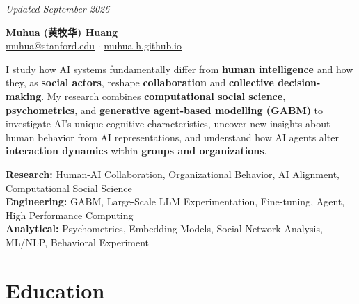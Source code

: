 \documentclass[11pt,letterpaper]{article}
\begin{document}
\begin{flushright}
\vspace{-1em}
\footnotesize\textit{Updated September 2026}
\end{flushright}

\vspace{-1em}

\begin{center}
{\LARGE\bfseries Muhua (黄牧华) Huang}\\[0.4em]
{\small\color{gray}
\href{mailto:muhua@stanford.edu}{muhua@stanford.edu}
\quad$\cdot$\quad
\href{https://muhua-h.github.io/}{muhua-h.github.io}}
\end{center}

\vspace{-0.3em}

\begin{statementbox}
\noindent I study how AI systems fundamentally differ from \textbf{human intelligence} and how they, as \textbf{social actors}, reshape \textbf{collaboration} and \textbf{collective decision-making}. My research combines \textbf{computational social science}, \textbf{psychometrics}, and \textbf{generative agent-based modelling (GABM)} to investigate AI's unique cognitive characteristics, uncover new insights about human behavior from AI representations, and understand how AI agents alter \textbf{interaction dynamics} within \textbf{groups and organizations}.
\end{statementbox}

\vspace{0.5em}

\noindent\textcolor{linkblue}{\textbf{Research:}} Human-AI Collaboration, Organizational Behavior, AI Alignment,
Computational Social Science\\
\noindent\textcolor{linkblue}{\textbf{Engineering:}} GABM, Large-Scale LLM
Experimentation, Fine-tuning, Agent, High Performance Computing\\
\noindent\textcolor{linkblue}{\textbf{Analytical:}} Psychometrics, Embedding Models, Social Network
Analysis, ML/NLP, Behavioral Experiment

\section*{Education}
\end{document}
